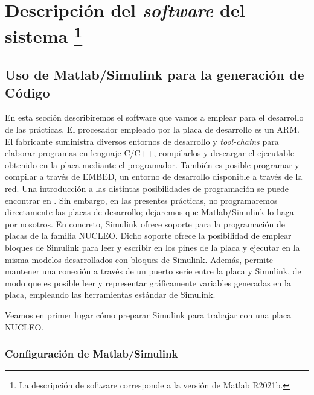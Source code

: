 \documentclass[10pt,a4paper]{report}
\begin{document}
\chapter{Descripción del \emph{software} del sistema \protect \footnote{La descripción de software corresponde a la versión de Matlab R2021b.}}
\section{Uso de Matlab/Simulink para la generación de Código}
En esta sección describiremos el software que vamos a emplear para el desarrollo de  las prácticas. El procesador empleado por la placa de desarrollo es un ARM. El fabricante suministra diversos entornos de desarrollo y \emph{tool-chains} para elaborar programas en lenguaje C/C++, compilarlos y descargar el ejecutable obtenido en la placa mediante el programador. También es posible programar y compilar a través de EMBED, un entorno de desarrollo disponible a través de la red. Una introducción a las distintas posibilidades de programación se puede encontrar en \cite{STNUCLEOSF}.
Sin embargo, en las presentes prácticas, no programaremos directamente las placas de desarrollo; dejaremos que Matlab/Simulink lo haga por nosotros. En concreto, Simulink ofrece soporte para la programación de placas de la familia NUCLEO.  Dicho soporte ofrece la posibilidad de emplear bloques de Simulink para leer y escribir en los pines de la placa y ejecutar en la misma modelos desarrollados con bloques de Simulink. Además, permite mantener una conexión a través de un puerto serie entre la placa y Simulink, de modo que es posible leer y representar gráficamente variables generadas en la placa, empleando las herramientas estándar de Simulink.

Veamos en primer lugar cómo preparar Simulink para trabajar con una placa NUCLEO.
\subsection{Configuración de Matlab/Simulink}
\end{document}

